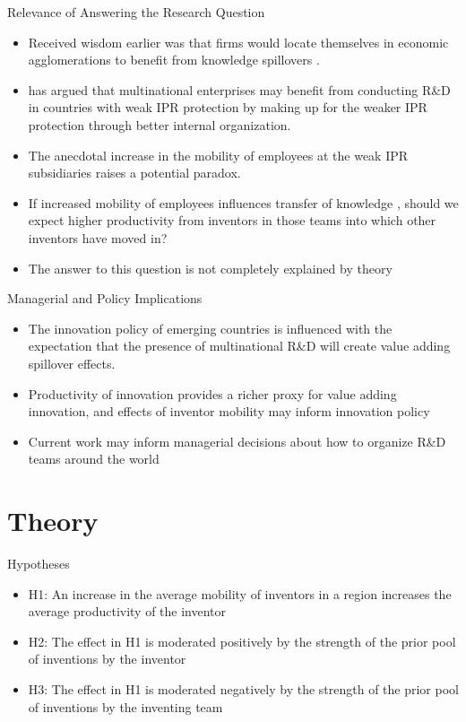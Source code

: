 \documentclass{beamer}
\begin{document}
\begin{frame}{Relevance of Answering the Research Question}{}
\begin{itemize}
\item{Received wisdom earlier was that firms would locate themselves in economic agglomerations to benefit from knowledge spillovers \citep{Jaffe1993}.}
\item{\cite{Zhao2006} has argued  that multinational enterprises may benefit from conducting R\&D in countries with weak IPR protection by  making up for the weaker IPR protection through better internal organization.}
\item{The anecdotal increase in the mobility of employees at the weak IPR subsidiaries raises a potential paradox.}
\item{If increased mobility of employees influences transfer of knowledge \citep{Almeida1999}, should we expect higher productivity  from inventors in those teams into which other inventors have moved in?}
\item{The answer to this question is not completely explained by theory}
\end{itemize}
\end{frame}

\begin{frame}{Managerial and Policy Implications}{}
\begin{itemize}
\item{The innovation policy of emerging countries is influenced with the expectation that the presence of multinational R\&D will create value adding spillover effects.}
\item{Productivity of innovation provides a richer proxy for value adding innovation, and effects of inventor mobility may inform innovation policy}
\item{Current work may inform managerial decisions about how to organize R\&D teams around the world}
\end{itemize}
\end{frame}

\section{Theory}
\begin{frame}{Hypotheses}{}
\begin{itemize}
\item{H1: An increase in the average mobility of inventors in a region increases the average productivity of  the inventor}
\item{H2: The effect in H1 is moderated positively by the strength of the prior pool of inventions by the inventor}
\item{H3: The effect in H1 is moderated negatively by the strength of the prior pool of inventions by the inventing team}
\end{itemize}
\end{frame}
\end{document}
